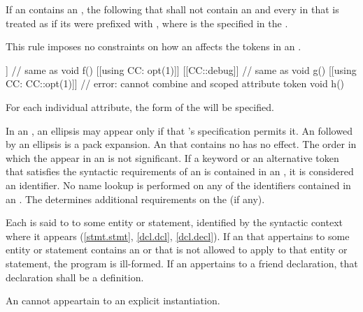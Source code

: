 \pnum
If an 
contains an ,
the  following that 
shall not contain an 
and every  in that 
is treated as if
its  were prefixed with ,
where  is the 
specified in the .
\begin{note}
This rule imposes no constraints on how
an 
affects the tokens in an .
\end{note}
\begin{example}
\begin{codeblock}
[[using CC: opt(1), debug]]         // same as 
  void f() {}
[[using CC: opt(1)]] [[CC::debug]]  // same as \tcode{[[CC::opt(1)]] [[CC::debug]]}
  void g() {}
[[using CC: CC::opt(1)]]            // error: cannot combine  and scoped attribute token
  void h() {}
\end{codeblock}
\end{example}

\pnum
\begin{note}
For each individual attribute, the form of the
 will be specified.
\end{note}

\pnum
In an , an ellipsis may appear only if that
's specification permits it. An  followed
by an ellipsis is a pack expansion.
An  that contains no  has no
effect. The order in which the  appear in an
 is not significant. If a
keyword
or an alternative token that satisfies the syntactic requirements
of an  is
contained in
an , it is considered an identifier. No name
lookup is performed on any of the identifiers contained in an
. The  determines additional
requirements on the  (if any).

\pnum
Each  is said to  to some entity or
statement, identified by the syntactic context where it appears
(\ref{stmt.stmt}, \ref{dcl.dcl},
\ref{dcl.decl}). If an  that appertains to some
entity or statement contains an  or  that
is not allowed to apply to that
entity or statement, the program is ill-formed. If an 
appertains to a friend declaration, that declaration shall be a
definition.
\begin{note}
An  cannot appeartain to
an explicit instantiation.
\end{note}

